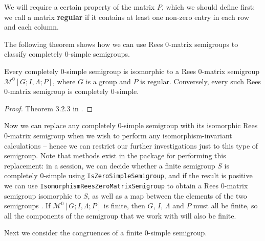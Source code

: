 We will require a certain property of the matrix $P$, which we should define
first: we call a matrix \textbf{regular}  if it contains
at least one non-zero entry in each row and each column.

The following theorem shows how we can use Rees 0-matrix semigroups to classify
completely 0-simple semigroups.

\begin{theorem}[Rees]
  \label{thm:rees}
  Every completely 0-simple semigroup is isomorphic to a Rees 0-matrix semigroup
  $\mathcal{M}^0[G;I,\Lambda;P]$, where $G$ is a group and $P$ is regular.
  Conversely, every such Rees 0-matrix semigroup is completely 0-simple.
  \begin{proof}
    Theorem 3.2.3 in \cite{howie}.
  \end{proof}
\end{theorem}

Now we can replace any completely 0-simple semigroup with its isomorphic Rees
0-matrix semigroup when we wish to perform any isomorphism-invariant
calculations -- hence we can restrict our further investigations just to this
type of semigroup.  Note that methods exist in the \Semigroups{} package for
performing this replacement: in a session, we can decide whether a finite
semigroup $S$ is completely 0-simple using \texttt{IsZeroSimpleSemigroup}, and
if the result is positive we can use \texttt{IsomorphismReesZeroMatrixSemigroup}
to obtain a Rees 0-matrix semigroup isomorphic to $S$, as well as a map between
the elements of the two semigroups \cite{semigroups}.
If $\mathcal{M}^0[G;I,\Lambda;P]$ is finite, then $G$, $I$, $\Lambda$ and $P$
must all be finite, so all the components of the semigroup that we work with
will also be finite.

Next we consider the congruences of a finite 0-simple semigroup.

